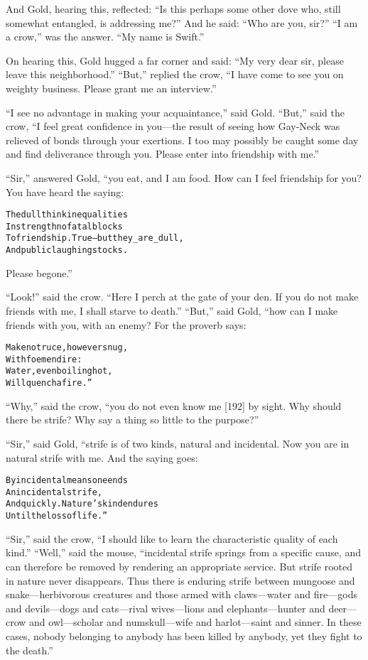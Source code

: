 \documentclass{article}
\renewenvironment{verbatim}{\begin{alltt}\normalfont\begin{centering}}{\end{centering}\end{alltt}}
\begin{document}
And Gold, hearing this, reflected:
``Is this perhaps some other dove who, still somewhat entangled, is addressing me?''
And he said: ``Who are you, sir?'' ``I am a crow,'' was the answer.
``My name is Swift.''

On hearing this, Gold hugged a far corner and said:
``My very dear sir, please leave this neighborhood.'' ``But,''
replied the crow,
``I have come to see you on weighty business. Please grant me an interview.''

``I see no advantage in making your acquaintance,'' said Gold.
``But,'' said the crow,
``I feel great confidence in you---the result of seeing how Gay-Neck was relieved of bonds through your exertions. I too may possibly be caught some day and find deliverance through you. Please enter into friendship with me.''

``Sir,'' answered Gold, “you eat, and I am food. How can I feel
friendship for you? You have heard the saying:

\begin{verbatim}
The dull think inequalities
    In strength no fatal blocks
To friendship. True--but they _are_ dull,
    And public laughingstocks.
\end{verbatim}
Please begone.”

``Look!'' said the crow.
``Here I perch at the gate of your den. If you do not make friends with me, I shall starve to death.''
``But,'' said Gold, “how can I make friends with you, with an
enemy? For the proverb says:

\begin{verbatim}
Make no truce, however snug,
    With foemen dire:
Water, even boiling hot,
    Will quench a fire.”
\end{verbatim}
``Why,'' said the crow,
``you do not even know me [192] by sight. Why should there be strife? Why say a thing so little to the purpose?''

``Sir,'' said Gold, “strife is of two kinds, natural and
incidental. Now you are in natural strife with me. And the saying
goes:

\begin{verbatim}
By incidental means one ends
    An incidental strife,
And quickly. Nature's kind endures
    Until the loss of life.”
\end{verbatim}
``Sir,'' said the crow,
``I should like to learn the characteristic quality of each kind.''
``Well,'' said the mouse,
``incidental strife springs from a specific cause, and can therefore be removed by rendering an appropriate service. But strife rooted in nature never disappears. Thus there is enduring strife between mungoose and snake---herbivorous creatures and those armed with claws---water and fire---gods and devils---dogs and cats---rival wives---lions and elephants---hunter and deer---crow and owl---scholar and numskull---wife and harlot---saint and sinner. In these cases, nobody belonging to anybody has been killed by anybody, yet they fight to the death.''
\end{document}
